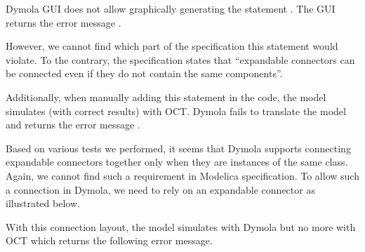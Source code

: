 \documentclass[letterpaper,10pt, openany,english]{sphinxmanual}
\begin{document}
\begin{figure}[htbp]
\centering

\noindent{}
\end{figure}


Dymola GUI does not allow graphically generating the statement . The GUI returns the error message .

However, we cannot find which part of the specification  this statement would violate. To the contrary, the specification states that “expandable connectors can be connected even if they do not contain the same components”.

Additionally, when manually adding this  statement in the code, the model simulates (with correct results) with OCT. Dymola fails to translate the model and returns the error message .

Based on various tests we performed, it seems that Dymola supports connecting  expandable connectors together only when they are instances of the same class. Again, we cannot find such a requirement in Modelica specification. To allow such a connection in Dymola, we need to rely on an  expandable connector as illustrated below.

\begin{figure}[htbp]
\centering

\noindent{}
\end{figure}


With this connection layout, the model simulates with Dymola but no more with OCT which returns the following error message.

\begin{sphinxVerbatim}[commandchars=\\\{\}]
        
     
\end{sphinxVerbatim}
\end{document}
